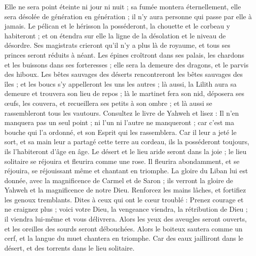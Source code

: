 \begin{multicols}{2}
Elle ne sera point éteinte ni jour ni nuit ; sa fumée montera éternellement, elle sera désolée de génération en génération ; il n'y aura personne qui passe par elle à jamais.
Le pélican et le hérisson la posséderont, la chouette et le corbeau y habiteront ; et on étendra sur elle la ligne de la désolation et le niveau de désordre.
Ses magistrats crieront qu'il n'y a plus là de royaume, et tous ses princes seront réduits à néant.
Les épines croîtront dans ses palais, les chardons et les buissons dans ses forteresses ; elle sera la demeure des dragons, et le parvis des hiboux.
Les bêtes sauvages des déserts rencontreront les bêtes sauvages des îles ; et les boucs s'y appelleront les uns les autres ; là aussi, la Lilith aura sa demeure et trouvera son lieu de repos ;
là le martinet fera son nid, déposera ses œufs, les couvera, et recueillera ses petits à son ombre ; et là aussi se rassembleront tous les vautours.
Consultez le livre de Yahweh et lisez : Il n'en manquera pas un seul point ; ni l'un ni l'autre ne manqueront ; car c'est ma bouche qui l'a ordonné, et son Esprit qui les rassemblera.
Car il leur a jeté le sort, et sa main leur a partagé cette terre au cordeau, ils la posséderont toujours, ils l'habiteront d'âge en âge.
\VerseOne{}Le désert et le lieu aride seront dans la joie ; le lieu solitaire se réjouira et fleurira comme une rose.
Il fleurira abondamment, et se réjouira, se réjouissant même et chantant en triomphe. La gloire du Liban lui est donnée, avec la magnificence de Carmel et de Saron ; ils verront la gloire de Yahweh et la magnificence de notre Dieu.
Renforcez les mains lâches, et fortifiez les genoux tremblants.
Dites à ceux qui ont le cœur troublé : Prenez courage et ne craignez plus ; voici votre Dieu, la vengeance viendra, la rétribution de Dieu ; il viendra lui-même et vous délivrera.
Alors les yeux des aveugles seront ouverts, et les oreilles des sourds seront débouchées.
Alors le boiteux sautera comme un cerf, et la langue du muet chantera en triomphe. Car des eaux jailliront dans le désert, et des torrents dans le lieu solitaire.

\end{multicols}
